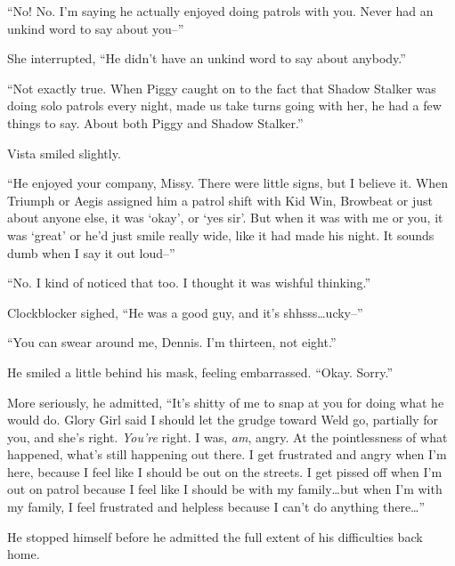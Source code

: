 ``No!  No.  I'm saying he actually enjoyed doing patrols with you.  Never had an unkind word to say about you--''



She interrupted, ``He didn't have an unkind word to say about anybody.''



``Not exactly true.  When Piggy caught on to the fact that Shadow Stalker was doing solo patrols every night, made us take turns going with her, he had a few things to say.  About both Piggy and Shadow Stalker.''



Vista smiled slightly.



``He enjoyed your company, Missy.  There were little signs, but I believe it.  When Triumph or Aegis assigned him a patrol shift with Kid Win, Browbeat or just about anyone else, it was `okay', or `yes sir'.  But when it was with me or you, it was `great' or he'd just smile really wide, like it had made his night.  It sounds dumb when I say it out loud--''



``No. I kind of noticed that too.  I thought it was wishful thinking.''



Clockblocker sighed, ``He was a good guy, and it's shhsss\ldots{}ucky--''



``You can swear around me, Dennis.  I'm thirteen, not eight.''



He smiled a little behind his mask, feeling embarrassed.  ``Okay.  Sorry.''



More seriously, he admitted, ``It's shitty of me to snap at you for doing what he would do.  Glory Girl said I should let the grudge toward Weld go, partially for you, and she's right.  \emph{You're} right.  I was, \emph{am}, angry.  At the pointlessness of what happened, what's still happening out there.  I get frustrated and angry when I'm here, because I feel like I should be out on the streets.  I get pissed off when I'm out on patrol because I feel like I should be with my family\ldots but when I'm with my family, I feel frustrated and helpless because I can't do anything there\ldots''



He stopped himself before he admitted the full extent of his difficulties back home.



